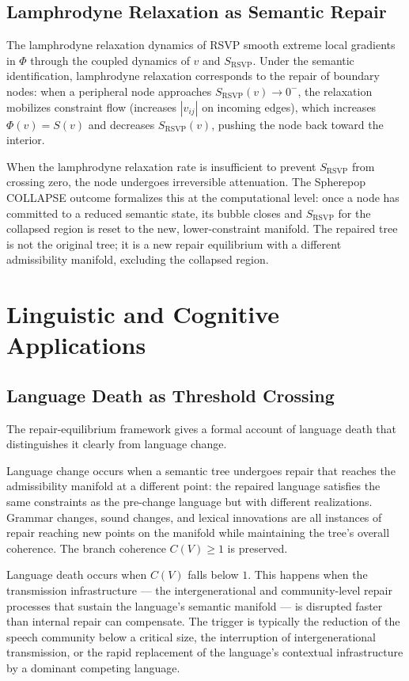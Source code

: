 \documentclass[11pt, a4paper]{article}
\theoremstyle{definition}
\theoremstyle{remark}
\begin{document}
\subsection{Lamphrodyne Relaxation as Semantic Repair}

The lamphrodyne relaxation dynamics of RSVP smooth extreme local gradients in
$\Phi$ through the coupled dynamics of $v$ and $S_{\mathrm{RSVP}}$. Under the
semantic identification, lamphrodyne relaxation corresponds to the repair of
boundary nodes: when a peripheral node approaches $S_{\mathrm{RSVP}}(v) \to 0^-$,
the relaxation mobilizes constraint flow (increases $|v_{ij}|$ on incoming
edges), which increases $\Phi(v) = S(v)$ and decreases $S_{\mathrm{RSVP}}(v)$,
pushing the node back toward the interior.

When the lamphrodyne relaxation rate is insufficient to prevent $S_{\mathrm{RSVP}}$
from crossing zero, the node undergoes irreversible attenuation. The Spherepop
COLLAPSE outcome formalizes this at the computational level: once a node has
committed to a reduced semantic state, its bubble closes and $S_{\mathrm{RSVP}}$
for the collapsed region is reset to the new, lower-constraint manifold. The
repaired tree is not the original tree; it is a new repair equilibrium with
a different admissibility manifold, excluding the collapsed region.

\section{Linguistic and Cognitive Applications}

\subsection{Language Death as Threshold Crossing}

The repair-equilibrium framework gives a formal account of language death that
distinguishes it clearly from language change.

Language change occurs when a semantic tree undergoes repair that reaches the
admissibility manifold at a different point: the repaired language satisfies
the same constraints as the pre-change language but with different realizations.
Grammar changes, sound changes, and lexical innovations are all instances of
repair reaching new points on the manifold while maintaining the tree's overall
coherence. The branch coherence $C(V) \geq 1$ is preserved.

Language death occurs when $C(V)$ falls below $1$. This happens when the
transmission infrastructure --- the intergenerational and community-level
repair processes that sustain the language's semantic manifold --- is disrupted
faster than internal repair can compensate. The trigger is typically the
reduction of the speech community below a critical size, the interruption of
intergenerational transmission, or the rapid replacement of the language's
contextual infrastructure by a dominant competing language.
\end{document}
